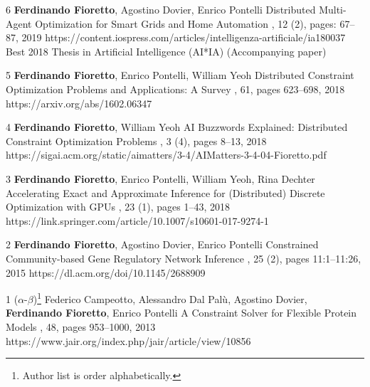 \begin{pubs}
	\journalentryAwd
	{6}	%
		{{\bf Ferdinando Fioretto}, Agostino Dovier, Enrico Pontelli}
		{Distributed Multi-Agent Optimization for Smart Grids and Home Automation}
		{,  12 (2), pages: 67--87, 2019}
		{https://content.iospress.com/articles/intelligenza-artificiale/ia180037}
		{Best 2018 Thesis in Artificial Intelligence (AI*IA)}
		{(Accompanying paper)}

	\journalentry
	{5}	%
		{{\bf Ferdinando Fioretto}, Enrico Pontelli, William Yeoh}
		{Distributed Constraint Optimization Problems and Applications: A Survey}
		{\JAIR, 61, pages 623--698, 2018} 
		{https://arxiv.org/abs/1602.06347}

	\journalentry 
	{4}	%
		{{\bf Ferdinando Fioretto}, William Yeoh}
		{AI Buzzwords Explained: Distributed Constraint Optimization Problems}
		{, 3 (4), pages 8--13, 2018}
		{https://sigai.acm.org/static/aimatters/3-4/AIMatters-3-4-04-Fioretto.pdf}

	\journalentry 
	{3}	%
		{{\bf Ferdinando Fioretto}, Enrico Pontelli, William Yeoh, Rina Dechter}
		{Accelerating Exact and Approximate Inference for (Distributed) Discrete Optimization with GPUs}
		{, 23 (1), pages 1--43, 2018}
		{https://link.springer.com/article/10.1007/s10601-017-9274-1}

	\journalentry 
	{2}	%
		{{\bf Ferdinando Fioretto}, Agostino Dovier, Enrico Pontelli}
		{Constrained Community-based Gene Regulatory Network Inference}
		{, 25 (2), pages 11:1--11:26, 2015}
		{https://dl.acm.org/doi/10.1145/2688909}

	\journalentry
	{1}	%
		{($\alpha$-$\beta$)\footnote{Author list is order alphabetically.} 
			Federico Campeotto, Alessandro Dal Pal\`{u}, Agostino Dovier,  {\bf Ferdinando Fioretto}, Enrico Pontelli}
		{A Constraint Solver for Flexible Protein Models}
		{\JAIR, 48, pages 953--1000, 2013}
		{https://www.jair.org/index.php/jair/article/view/10856}
\end{pubs}


